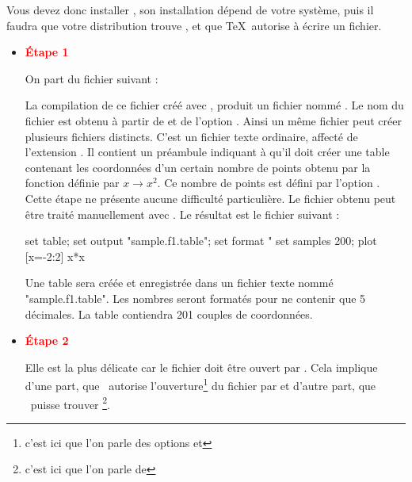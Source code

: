  Vous devez donc installer ,  son installation dépend de votre système, puis  il faudra que votre distribution trouve , et que  \TeX\  autorise  à écrire un fichier.

\begin{itemize}
\item \textcolor{red}{\textbf{Étape 1}}

On part du fichier  suivant :

\medskip    
{} 
 \tkzActivOn

La compilation de ce fichier créé avec \TIKZ, produit un fichier nommé    . Le nom du fichier est obtenu à partir de  et de l'option . Ainsi un même fichier peut créer plusieurs fichiers distincts. C'est un fichier texte ordinaire, affecté de l'extension . Il contient un préambule indiquant à  qu'il doit créer une table contenant les coordonnées d'un certain nombre de points obtenu par la fonction définie par $x\longrightarrow x^2$. Ce nombre de points est défini par l'option . Cette étape ne présente aucune difficulté particulière. Le fichier obtenu peut être traité manuellement avec .  Le résultat est le fichier suivant : 

\begin{tkzltxexample}[]  
set table; set output "sample.f1.table"; set format "%
set samples 200; plot [x=-2:2] x*x  
\end{tkzltxexample} 

Une table sera créée et enregistrée dans un fichier texte nommé "sample.f1.table". Les nombres seront formatés pour ne contenir que 5 décimales.
La table contiendra 201 couples de coordonnées. 
 
\item  \textcolor{red}{\textbf{Étape 2}} 

Elle est la plus délicate car  le fichier  doit être ouvert par . Cela implique d'une part, que   \TEX\  autorise l'ouverture\footnote{c'est ici que l'on parle des options  et }
   du  fichier  par  et d'autre part, que   \TEX\ puisse trouver \footnote{c'est ici que l'on parle de }. 


\end{itemize}
